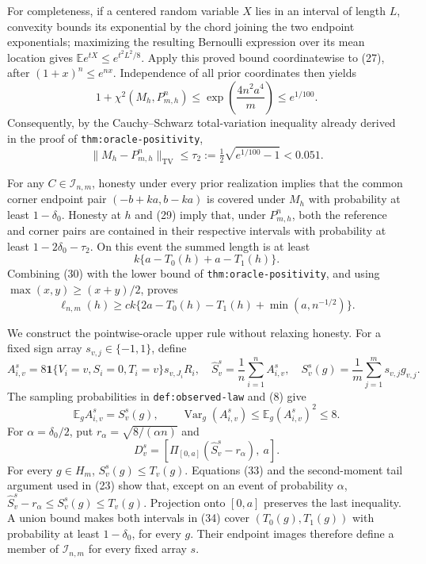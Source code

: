 For completeness, if a centered random variable \(X\) lies in an interval
of length \(L\), convexity bounds its exponential by the chord joining the
two endpoint exponentials; maximizing the resulting Bernoulli expression
over its mean location gives
\(\mathbb Ee^{tX}\le e^{t^2L^2/8}\).  Apply this proved bound coordinatewise
to (27), after \((1+x)^n\le e^{nx}\).  Independence of all prior coordinates
then yields
\[
 1+\chi^2(M_h,P_{m,h}^n)
 \le\exp\left(\frac{4n^2a^4}{m}\right)\le e^{1/100}.                     \tag{28}
\]
Consequently, by the Cauchy--Schwarz total-variation inequality already
derived in the proof of \texttt{thm:oracle-positivity},
\[
 \|M_h-P_{m,h}^n\|_{\mathrm{TV}}
 \le\tau_2:=\tfrac12\sqrt{e^{1/100}-1}<0.051.                            \tag{29}
\]

For any \(C\in\mathcal I_{n,m}\), honesty under every prior realization
implies that the common corner endpoint pair \((-b+ka,b-ka)\) is covered
under \(M_h\) with probability at least \(1-\delta_0\).  Honesty at \(h\)
and (29) imply that, under \(P_{m,h}^n\), both the reference and corner pairs
are contained in their respective intervals with probability at least
\(1-2\delta_0-\tau_2\).  On this event the summed length is at least
\[
 k\{a-T_0(h)+a-T_1(h)\}.                                                  \tag{30}
\]
Combining (30) with the lower bound of
\texttt{thm:oracle-positivity}, and using
\(\max(x,y)\ge(x+y)/2\), proves
\[
 \ell_{n,m}(h)\ge
 ck\{2a-T_0(h)-T_1(h)+\min(a,n^{-1/2})\}.                                \tag{31}
\]

We construct the pointwise-oracle upper rule without relaxing honesty.
For a fixed sign array \(s_{v,j}\in\{-1,1\}\), define
\[
 A_{i,v}^{s}=8\mathbf1\{V_i=v,S_i=0,T_i=v\}s_{v,J_i}R_i,
 \quad
 \widehat S_v^{s}=\frac1n\sum_{i=1}^nA_{i,v}^{s},
 \quad
 S_v^{s}(g)=\frac1m\sum_{j=1}^ms_{v,j}g_{v,j}.                           \tag{32}
\]
The sampling probabilities in \texttt{def:observed-law} and (8) give
\[
 \mathbb E_gA_{i,v}^{s}=S_v^{s}(g),\qquad
 \operatorname{Var}_g(A_{i,v}^{s})\le\mathbb E_g(A_{i,v}^{s})^2\le8.    \tag{33}
\]
For \(\alpha=\delta_0/2\), put \(r_\alpha=\sqrt{8/(\alpha n)}\) and
\[
 D_v^s=\left[
 \Pi_{[0,a]}(\widehat S_v^s-r_\alpha),\ a\right].                       \tag{34}
\]
For every \(g\in H_m\), \(S_v^s(g)\le T_v(g)\).  Equations (33) and the
second-moment tail argument used in (23) show that, except on an event of
probability \(\alpha\),
\(\widehat S_v^s-r_\alpha\le S_v^s(g)\le T_v(g)\).  Projection onto
\([0,a]\) preserves the last inequality.  A union bound makes both intervals
in (34) cover \((T_0(g),T_1(g))\) with probability at least
\(1-\delta_0\), for every \(g\).  Their endpoint images therefore define a
member of \(\mathcal I_{n,m}\) for every fixed array \(s\).

